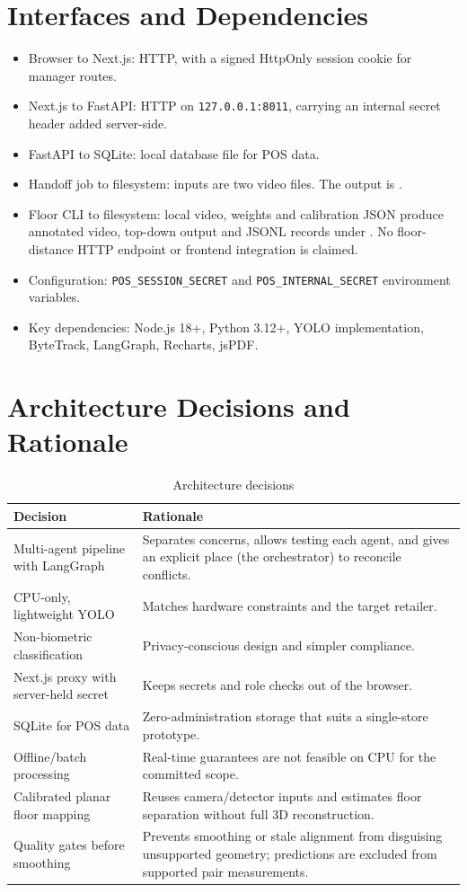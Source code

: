 \section{Interfaces and Dependencies}
\begin{itemize}
\item Browser to Next.js: HTTP, with a signed HttpOnly session cookie for manager routes.
\item Next.js to FastAPI: HTTP on \texttt{127.0.0.1:8011}, carrying an internal secret header added server-side.
\item FastAPI to SQLite: local database file for POS data.
\item Handoff job to filesystem: inputs are two video files. The output is .
\item Floor CLI to filesystem: local video, weights and calibration JSON produce annotated video, top-down output and JSONL records under . No floor-distance HTTP endpoint or frontend integration is claimed.
\item Configuration: \texttt{POS\_SESSION\_SECRET} and \texttt{POS\_INTERNAL\_SECRET} environment variables.
\item Key dependencies: Node.js 18+, Python 3.12+, YOLO implementation, ByteTrack, LangGraph, Recharts, jsPDF.
\end{itemize}

\section{Architecture Decisions and Rationale}
\begin{table}[H]
\centering
\caption{Architecture decisions}
\begin{tabular}{P{0.3\textwidth}P{0.58\textwidth}}
\toprule
Decision & Rationale\\
\midrule
Multi-agent pipeline with LangGraph & Separates concerns, allows testing each agent, and gives an explicit place (the orchestrator) to reconcile conflicts.\\
CPU-only, lightweight YOLO & Matches hardware constraints and the target retailer.\\
Non-biometric classification & Privacy-conscious design and simpler compliance.\\
Next.js proxy with server-held secret & Keeps secrets and role checks out of the browser.\\
SQLite for POS data & Zero-administration storage that suits a single-store prototype.\\
Offline/batch processing & Real-time guarantees are not feasible on CPU for the committed scope.\\
Calibrated planar floor mapping & Reuses camera/detector inputs and estimates floor separation without full 3D reconstruction.\\
Quality gates before smoothing & Prevents smoothing or stale alignment from disguising unsupported geometry; predictions are excluded from supported pair measurements.\\
\bottomrule
\end{tabular}
\end{table}

